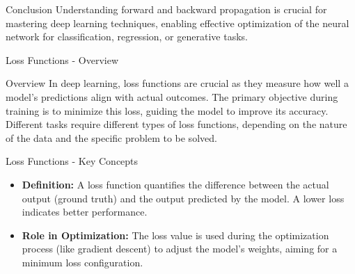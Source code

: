 \documentclass[aspectratio=169]{beamer}
\begin{document}
\begin{frame}{Conclusion}
    Understanding forward and backward propagation is crucial for mastering deep learning techniques, enabling effective optimization of the neural network for classification, regression, or generative tasks.
\end{frame}

\begin{frame}[fragile]{Loss Functions - Overview}
    \begin{block}{Overview}
        In deep learning, loss functions are crucial as they measure how well a model's predictions align with actual outcomes. The primary objective during training is to minimize this loss, guiding the model to improve its accuracy. Different tasks require different types of loss functions, depending on the nature of the data and the specific problem to be solved.
    \end{block}
\end{frame}

\begin{frame}[fragile]{Loss Functions - Key Concepts}
    \begin{itemize}
        \item \textbf{Definition:} A loss function quantifies the difference between the actual output (ground truth) and the output predicted by the model. A lower loss indicates better performance.
        
        \item \textbf{Role in Optimization:} The loss value is used during the optimization process (like gradient descent) to adjust the model's weights, aiming for a minimum loss configuration.
    \end{itemize}
\end{frame}
\end{document}
